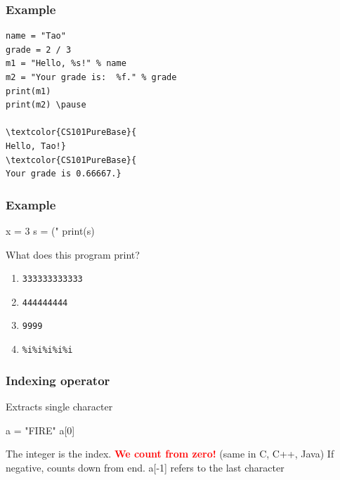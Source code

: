 \documentclass[11pt]{beamer}
\begin{document}
\begin{frame}[fragile]
  \frametitle{Example}
  \Enlarge

  \begin{Verbatim}[commandchars=\\\{\}]
name = "Tao"
grade = 2 / 3
m1 = "Hello, %s!" % name
m2 = "Your grade is:  %f." % grade
print(m1)
print(m2) \pause

\textcolor{CS101PureBase}{
Hello, Tao!}
\textcolor{CS101PureBase}{
Your grade is 0.66667.}
  \end{Verbatim}
\end{frame}

\begin{frame}[fragile]
  \frametitle{Example}
  \Enlarge

  \begin{semiverbatim}
x = 3
s = ("%
print(s)
  \end{semiverbatim}

  What does this program print?
  \begin{enumerate}[label=\Alph*]
  \item  \texttt{333333333333}
  \item  \texttt{444444444}
  \item  \texttt{9999}
  \item  \texttt{\%i\%i\%i\%i\%i}
  \end{enumerate}
\end{frame}

\begin{frame}[fragile]
  \frametitle{Indexing operator}
  \Enlarge

  \begin{itemize}
  \myitem  Extracts single character \pause
\begin{semiverbatim}
a = "FIRE"
a[0]
\end{semiverbatim} \pause
  \myitem  The integer is the index. \pause
  \myitem  \textcolor{red}{\bf We count from zero!} (same in C, C++, Java) \pause
  \myitem  If negative, counts down from end.
  \myitem a[-1] refers to the last character
  \end{itemize}
\end{frame}
\end{document}
